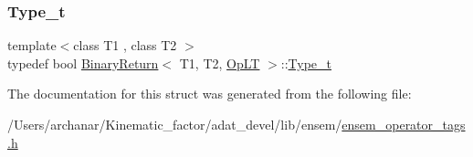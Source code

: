 \subsubsection{\texorpdfstring{Type\_t}{Type\_t}\hspace{0.1cm}{\footnotesize\ttfamily [2/2]}}
{\footnotesize\ttfamily template$<$class T1 , class T2 $>$ \\
typedef bool \mbox{\hyperlink{structBinaryReturn}{Binary\+Return}}$<$ T1, T2, \mbox{\hyperlink{structOpLT}{Op\+LT}} $>$\+::\mbox{\hyperlink{structBinaryReturn_3_01T1_00_01T2_00_01OpLT_01_4_a81d2cdfa9ce7378eebb7619141857f6d}{Type\+\_\+t}}}



The documentation for this struct was generated from the following file\+:\begin{DoxyCompactItemize}
\item 
/\+Users/archanar/\+Kinematic\+\_\+factor/adat\+\_\+devel/lib/ensem/\mbox{\hyperlink{lib_2ensem_2ensem__operator__tags_8h}{ensem\+\_\+operator\+\_\+tags.\+h}}\end{DoxyCompactItemize}
